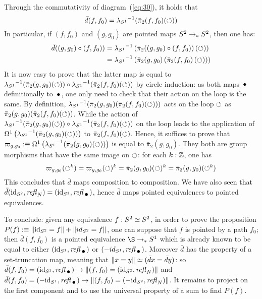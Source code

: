 \documentclass[english,a4]{article}
\begin{document}
Through the commutativity of diagram~(\ref{eq:30}), it holds that
\begin{equation}
  \bar d(f,f_0) = {\lambda_{S^1}}^{-1}(\bar \pi_2(f,f_0)(\mathord{\circlearrowleft}))
\end{equation}
In particular, if $(f,f_0)$ and $(g,g_0)$ are pointed maps
${S^2} \to_\ast {S^2}$, then one has:
\begin{equation}
  \label{eq:37}
  \begin{aligned}
    \bar d ((g,g_0) \circ (f,f_0))
    &= {\lambda_{S^1}}^{-1} \left(
      \bar\pi_2((g,g_0) \circ (f,f_0))\left( \mathord{\circlearrowleft} \right)
    \right)
    \\
    &= {\lambda_{S^1}}^{-1} \left(
      \bar\pi_2(g,g_0)\left( \bar\pi_2(f,f_0)\left(  \mathord{\circlearrowleft} \right) \right)
    \right)
  \end{aligned}
\end{equation}
It is now easy to prove that the latter map is equal to
${\lambda_{S^1}}^{-1}(\bar \pi_2(g,g_0)(\mathord{\circlearrowleft})) \circ
{\lambda_{S^1}}^{-1}(\bar \pi_2(f,f_0)(\mathord{\circlearrowleft}))$ by circle induction: as
both maps $\base$ definitionally to $\base$, one only need to check
that their action on the loop is the same. By definition,
${\lambda_{S^1}}^{-1}(\bar \pi_2(g,g_0)(\bar\pi_2(f,f_0)(\mathord{\circlearrowleft})))$ acts
on the loop $\mathord{\circlearrowleft}$ as $\bar
\pi_2(g,g_0)(\bar\pi_2(f,f_0)(\mathord{\circlearrowleft}))$. While the action of
${\lambda_{S^1}}^{-1}(\bar \pi_2(g,g_0)(\mathord{\circlearrowleft})) \circ
{\lambda_{S^1}}^{-1}(\bar \pi_2(f,f_0)(\mathord{\circlearrowleft}))$ on the loop leads to the
application of
$\mathop{\Omega^{1}} \left({\lambda_{S^1}}^{-1}(\bar
  \pi_2(g,g_0)(\mathord{\circlearrowleft}))\right)$ to $\bar\pi_2(f,f_0)(\mathord{\circlearrowleft})$. Hence,
it suffices to prove that
$\varpi_{g,g_0} \mathrel{\hbox{:}\mkern-5mu\equiv}\mathop{\Omega^{1}} \left({\lambda_{S^1}}^{-1}(\bar
  \pi_2(g,g_0)(\mathord{\circlearrowleft}))\right)$ is equal to $\bar \pi_2(g,g_0)$. They
both are group morphisms that have the same image on $\mathord{\circlearrowleft}$: for
each
$k:\mathbb{Z}$, one has
\begin{equation}
  \label{eq:39}
  \varpi_{g,g_0} (\mathord{\circlearrowleft}^k) = \varpi_{g,g_0} (\mathord{\circlearrowleft})^k
  = \bar\pi_2(g,g_0)(\mathord{\circlearrowleft})^k = \bar\pi_2(g,g_0)(\mathord{\circlearrowleft}^k)
\end{equation}
This concludes that $\bar d$ maps composition to composition. We have
also seen that $\bar d (\id_\Sp,\refl N) = (\id_\Sc,\refl\base)$,
hence $\bar d$ maps pointed equivalences to pointed equivalences.

To conclude: given any equivalence $f:{S^2}\simeq {S^2}$, in order to
prove the proposition
$P(f)\mathrel{\hbox{:}\mkern-5mu\equiv} \lVert\mathord{\mathrm{id}}_{S^2} = f\rVert + \lVert\-id_{S^2} = f\rVert$, one
can suppose that $f$ is pointed by a path $f_0$; then $\bar d(f,f_0)$
is a pointed equivalence $\S \ptdto \Sc$ which is already known to be
equal to either $(\id_\Sc,\refl\base)$ or
$(-id_\Sc,\refl\base)$. Moreover $\bar d$ has the property of a
set-truncation map, meaning that
$\lVert x=y\rVert \simeq (\bar d x = \bar d y)$: so
$\bar d(f,f_0) = (\id_\Sc,\refl \base) \to \Truncprop{(f,f_0) =
  (\id_\Sp,\refl N)}$ and
$\bar d(f,f_0) = (-\id_\Sc,\refl \base) \to \Truncprop{(f,f_0) =
  (-\id_\Sp,\refl N)}$. It remains to project on the first component
and to use the universal property of a sum to find $P(f)$.
\end{document}
